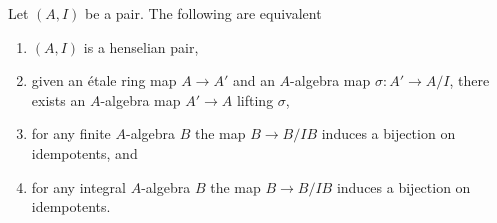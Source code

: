 \begin{lemma}
\label{lemma-characterize-henselian-pair}
Let $(A, I)$ be a pair. The following are equivalent
\begin{enumerate}
\item $(A, I)$ is a henselian pair,
\item given an \'etale ring map $A \to A'$ and an $A$-algebra map
$\sigma : A' \to A/I$, there exists an $A$-algebra map $A' \to A$
lifting $\sigma$,
\item for any finite $A$-algebra $B$ the map $B \to B/IB$ induces
a bijection on idempotents, and
\item for any integral $A$-algebra $B$ the map $B \to B/IB$ induces
a bijection on idempotents.
\end{enumerate}
\end{lemma}

